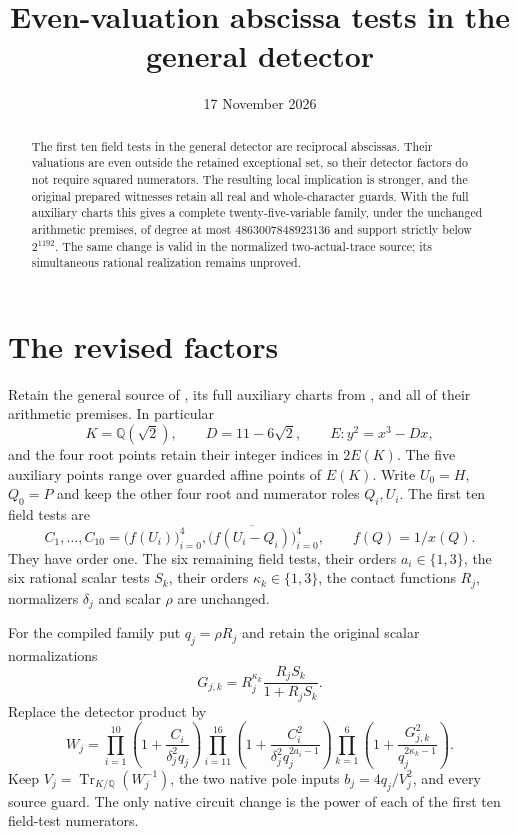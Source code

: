 \documentclass[11pt,a4paper]{article}
\title{Even-valuation abscissa tests in the general detector}
\author{}\date{17 November 2026}
\newcommand{\Q}{\mathbb Q}\newcommand{\Z}{\mathbb Z}
\newcommand{\Tr}{\operatorname{Tr}}
\begin{document}
\maketitle
\begin{abstract}
The first ten field tests in the general detector are reciprocal
abscissas. Their valuations are even outside the retained exceptional
set, so their detector factors do not require squared numerators.
The resulting local implication is stronger, and the original
prepared witnesses retain all real and whole-character guards.
With the full auxiliary charts this gives a complete twenty-five-variable
family, under the unchanged arithmetic premises, of degree at most
$4863007848923136$ and support strictly below $2^{1192}$.
The same change is valid in the normalized two-actual-trace source;
its simultaneous rational realization remains unproved.
\end{abstract}

\section{The revised factors}

Retain the general source of \cite{General,Unit}, its full auxiliary
charts from \cite{FullAux}, and all of their arithmetic premises.
In particular
\[
 K=\Q(\sqrt2),\qquad D=11-6\sqrt2,\qquad
 E:y^2=x^3-Dx,
\]
and the four root points retain their integer indices in $2E(K)$.
The five auxiliary points range over guarded affine points of $E(K)$.
Write $U_0=H$, $Q_0=P$ and keep the other four root and numerator
roles $Q_i,U_i$. The first ten field tests are
\[
 C_1,\ldots,C_{10}
 =\bigl(f(U_i)\bigr)_{i=0}^4,
   \bigl(\overline{f(U_i-Q_i)}\bigr)_{i=0}^4,
 \qquad f(Q)=1/x(Q).
\]
They have order one. The six remaining field tests, their orders
$a_i\in\{1,3\}$, the six rational scalar tests $S_k$, their orders
$\kappa_k\in\{1,3\}$, the contact functions $R_j$, normalizers
$\delta_j$ and scalar $\rho$ are unchanged.

For the compiled family put $q_j=\rho R_j$ and retain the original
scalar normalizations
\[
 G_{j,k}=R_j^{\kappa_k}\frac{R_jS_k}{1+R_jS_k}.
\]
Replace the detector product by
\begin{equation}\label{eq:product}
 W_j=
 \prod_{i=1}^{10}\left(1+\frac{C_i}{\delta_j^2q_j}\right)
 \prod_{i=11}^{16}
       \left(1+\frac{C_i^2}{\delta_j^2q_j^{2a_i-1}}\right)
 \prod_{k=1}^{6}
       \left(1+\frac{G_{j,k}^2}{q_j^{2\kappa_k-1}}\right).
\end{equation}
Keep $V_j=\Tr_{K/\Q}(W_j^{-1})$, the two native pole inputs
$b_j=4q_j/V_j^2$, and every source guard. The only native circuit
change is the power of each of the first ten field-test numerators.
\end{document}
